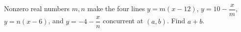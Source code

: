 Nonzero real numbers $m,n$ make the four lines $y=m(x-12)$, $y=10-\dfrac{x}{m}$, $y=n(x-6)$, and $y=-4-\dfrac{x}{n}$ concurrent at $(a,b)$. Find $a+b$.
